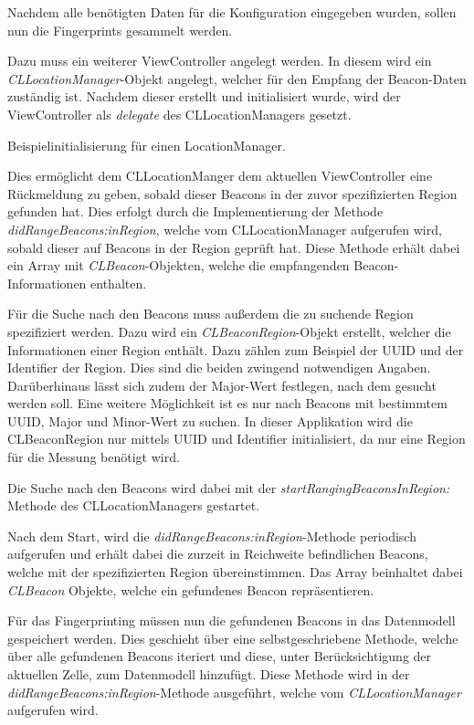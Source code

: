 Nachdem alle benötigten Daten für die Konfiguration eingegeben wurden, sollen nun die Fingerprints gesammelt werden.

Dazu muss ein weiterer ViewController angelegt werden. In diesem wird ein \emph{CLLocationManager}-Objekt angelegt, welcher für den Empfang der Beacon-Daten zuständig ist. Nachdem dieser erstellt und initialisiert wurde, wird der ViewController als \emph{delegate} des CLLocationManagers gesetzt.

\begin{listing}[htb!]
    \caption{Beispielinitialisierung für einen LocationManager.}
    \label{lst:locationmanager_objc}
\end{listing}

Dies ermöglicht dem CLLocationManger dem aktuellen ViewController eine Rückmeldung zu geben, sobald dieser Beacons in der zuvor spezifizierten Region gefunden hat. Dies erfolgt durch die Implementierung der Methode \emph{didRangeBeacons:inRegion}, welche vom CLLocationManager aufgerufen wird, sobald dieser auf Beacons in der Region geprüft hat. Diese Methode erhält dabei ein Array mit \emph{CLBeacon}-Objekten, welche die empfangenden Beacon-Informationen enthalten. 

Für die Suche nach den Beacons muss außerdem die zu suchende Region spezifiziert werden. Dazu wird ein \emph{CLBeaconRegion}-Objekt erstellt, welcher die Informationen einer Region enthält. Dazu zählen zum Beispiel der UUID und der Identifier der Region. Dies sind die beiden zwingend notwendigen Angaben. Darüberhinaus lässt sich zudem der Major-Wert festlegen, nach dem gesucht werden soll. Eine weitere Möglichkeit ist es nur nach Beacons mit bestimmtem UUID, Major und Minor-Wert zu suchen.
In dieser Applikation wird die CLBeaconRegion nur mittels UUID und Identifier initialisiert, da nur eine Region für die Messung benötigt wird.

Die Suche nach den Beacons wird dabei mit der \emph{startRangingBeaconsInRegion:} Methode des CLLocationManagers gestartet.

Nach dem Start, wird die \emph{didRangeBeacons:inRegion}-Methode periodisch aufgerufen und erhält dabei die zurzeit in Reichweite befindlichen Beacons, welche mit der spezifizierten Region übereinstimmen.
Das Array beinhaltet dabei \emph{CLBeacon} Objekte, welche ein gefundenes Beacon repräsentieren.

Für das Fingerprinting müssen nun die gefundenen Beacons in das Datenmodell gespeichert werden. Dies geschieht über eine selbstgeschriebene Methode, welche über alle gefundenen Beacons iteriert und diese, unter Berücksichtigung der aktuellen Zelle, zum Datenmodell hinzufügt. Diese Methode wird in der \emph{didRangeBeacons:inRegion}-Methode ausgeführt, welche vom \emph{CLLocationManager} aufgerufen wird.


